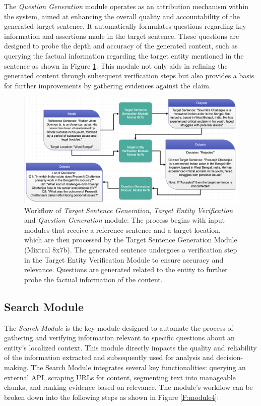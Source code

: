 \documentclass[11pt]{article}
\begin{document}
	The \emph{Question Generation} module operates as an attribution mechanism within the system, aimed at enhancing the overall quality and accountability of the generated target sentence. It automatically formulates questions regarding key information and assertions made in the target sentence. These questions are designed to probe the depth and accuracy of the generated content, such as querying the factual information regarding the target entity mentioned in the sentence as shown in Figure \ref{F:module123}. This module not only aids in refining the generated content through subsequent verification steps but also provides a basis for further improvements by gathering evidences against the claim.
	
	
	\begin{figure}[tbh]
		\centering
		\includegraphics[width=\textwidth]{module123}
		\caption{Workflow of \emph{Target Sentence Generation}, \emph{Target Entity Verification} and \emph{Question Generation} module: The process begins with input modules that receive a reference sentence and a target location, which are then processed by the Target Sentence Generation Module (Mixtral 8x7b). The generated sentence undergoes a verification step in the Target Entity Verification Module to ensure accuracy and relevance. Questions are generated related to the entity to further probe the factual information of the content.}
		\label{F:module123}
	\end{figure}
	
	\subsection{Search Module}
	
	The \emph{Search Module} is the key module designed to automate the process of gathering and verifying information relevant to specific questions about an entity's localized context. This module directly impacts the quality and reliability of the information extracted and subsequently used for analysis and decision-making. The Search Module integrates several key functionalities: querying an external API, scraping URLs for content, segmenting text into manageable chunks, and ranking evidence based on relevance. The module's workflow can be broken down into the following steps as shown in Figure \ref{F:module4}:
	
\end{document}
